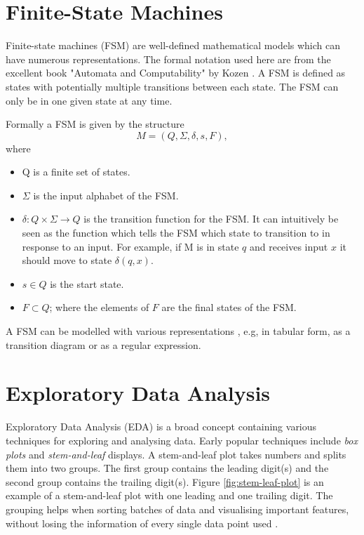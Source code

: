 \section{Finite-State Machines}
Finite-state machines (FSM) are well-defined mathematical models which can have numerous representations.
The formal notation used here are from the excellent book "Automata and Computability" by Kozen \cite{Kozen1997}.
A FSM is defined as states with potentially multiple transitions between each state.
The FSM can only be in one given state at any time.

Formally a FSM is given by the structure
\[M = (Q, \Sigma, \delta, s, F),\]
where
\begin{itemize}
    \item Q is a finite set of states.
    \item $\Sigma$ is the input alphabet of the FSM.
    \item $\delta : Q \times \Sigma \rightarrow Q$ is the transition function for the FSM.
    It can intuitively be seen as the function which tells the FSM which state to transition to in response to an input.
    For example, if M is in state $q$ and receives input $x$ it should move to state $\delta(q, x)$.
    \item $s \in Q$ is the start state.
    \item $F \subset Q$; where the elements of $F$ are the final states of the FSM.
\end{itemize}

A FSM can be modelled with various representations \cite{Kozen1997}, e.g, in tabular form, as a transition diagram or as a regular expression.

\section{Exploratory Data Analysis}
Exploratory Data Analysis (EDA) is a broad concept containing various techniques \cite{Anselin1999, Gelman2003, Hoaglin2003, Tukey1977, Velleman1981} for exploring and analysing data.
Early popular techniques include \emph{box plots} and \emph{stem-and-leaf} displays.
A stem-and-leaf plot takes numbers and splits them into two groups.
The first group contains the leading digit(s) and the second group contains the trailing digit(s).
Figure \ref{fig:stem-leaf-plot} is an example of a stem-and-leaf plot with one leading and one trailing digit.
The grouping helps when sorting batches of data and visualising important features, without losing the information of every single data point used \cite{Velleman1981}.

